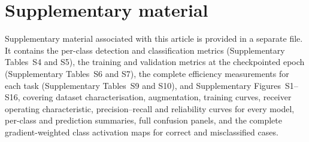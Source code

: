 \documentclass[final,3p,times,number]{elsarticle}
\begin{document}
\section*{Supplementary material}

Supplementary material associated with this article is provided in a separate file. It contains the per-class detection and classification metrics (Supplementary Tables~S4 and S5), the training and validation metrics at the checkpointed epoch (Supplementary Tables~S6 and S7), the complete efficiency measurements for each task (Supplementary Tables~S9 and S10), and Supplementary Figures~S1--S16, covering dataset characterisation, augmentation, training curves, receiver operating characteristic, precision--recall and reliability curves for every model, per-class and prediction summaries, full confusion panels, and the complete gradient-weighted class activation maps for correct and misclassified cases.
\end{document}
